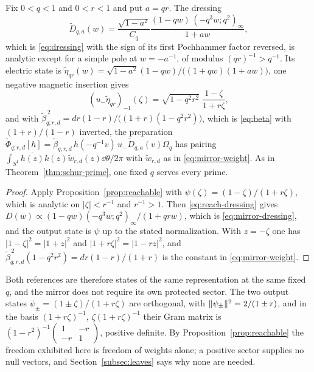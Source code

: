 \begin{corollary}
\label{cor:mirror-schur}
Fix $0<q<1$ and $0<r<1$ and put $a=qr$. The dressing
\begin{equation}\label{eq:mirror-dressing}
 \widetilde D_{q,a}(w)=\frac{\sqrt{1-a^2}}{C_q}
 \frac{(1-qw)\,(-q^3w;q^2)_\infty}{1+aw},
\end{equation}
which is \eqref{eq:dressing} with the sign of its first Pochhammer factor
reversed, is analytic except for a simple pole at $w=-a^{-1}$, of modulus
$(qr)^{-1}>q^{-1}$. Its electric state is
$\widetilde\eta_{qr}(w)=\sqrt{1-a^2}(1-qw)/\big((1+qw)(1+aw)\big)$, one negative
magnetic insertion gives
\begin{equation}\label{eq:mirror-state}
 (u_-\widetilde\eta_{qr})_{-1}(\zeta)
 =\sqrt{1-q^2r^2}\;\frac{1-\zeta}{1+r\zeta},
\end{equation}
and with
$\widetilde\beta_{q;r,d}^{\,2}=dr(1-r)\big/\big((1+r)(1-q^2r^2)\big)$, which is
\eqref{eq:beta} with $(1+r)/(1-r)$ inverted, the preparation
$\widetilde\Phi_{q;r,d}[h]
 =\widetilde\beta_{q;r,d}\,h(-q^{-1}v)\,u_-\widetilde D_{q,a}(v)\Omega_q$
has pairing $\int_{S^1}\overline{h(z)}k(z)\widetilde w_{r,d}(z)\dd\theta/2\pi$
with $\widetilde w_{r,d}$ as in \eqref{eq:mirror-weight}. As in
Theorem~\ref{thm:schur-prime}, one fixed $q$ serves every prime.
\end{corollary}
\begin{proof}
Apply Proposition~\ref{prop:reachable} with
$\psi(\zeta)=(1-\zeta)/(1+r\zeta)$, which is analytic on $|\zeta|<r^{-1}$ and
$r^{-1}>1$. Then \eqref{eq:reach-dressing} gives
$D(w)\propto(1-qw)(-q^3w;q^2)_\infty/(1+qrw)$, which is
\eqref{eq:mirror-dressing}, and the output state is $\psi$ up to the stated
normalization. With $z=-\zeta$ one has $|1-\zeta|^2=|1+z|^2$ and
$|1+r\zeta|^2=|1-rz|^2$, and
$\widetilde\beta^{\,2}_{q;r,d}(1-q^2r^2)=dr(1-r)/(1+r)$ is the constant in
\eqref{eq:mirror-weight}.
\end{proof}

Both references are therefore states of the same representation at the same
fixed $q$, and the mirror does not require its own protected sector. The two
output states $\psi_\pm=(1\pm\zeta)/(1+r\zeta)$ are orthogonal, with
$\lVert \psi_\pm\rVert^2=2/(1\pm r)$, and in the basis $(1+r\zeta)^{-1}$,
$\zeta(1+r\zeta)^{-1}$ their Gram matrix is
$(1-r^2)^{-1}\left(\begin{smallmatrix}1&-r\\-r&1\end{smallmatrix}\right)$,
positive definite. By Proposition~\ref{prop:reachable} the freedom exhibited
here is freedom of weights alone; a positive sector supplies no null vectors,
and Section~\ref{subsec:leaves} says why none are needed.

